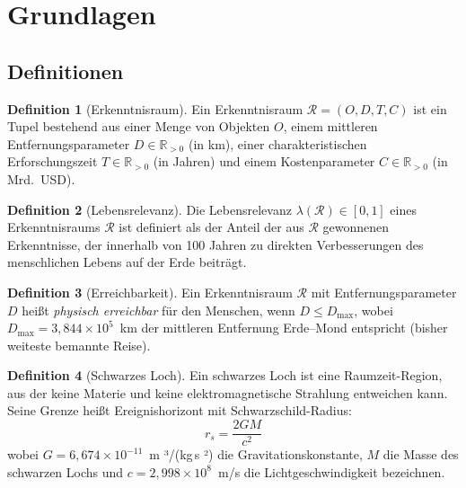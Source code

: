 ﻿\documentclass[a4paper,12pt]{article}
\theoremstyle{definition}
\newtheorem{definition}{Definition}
\begin{document}
\section{Grundlagen}

\subsection{Definitionen}

\begin{definition}[Erkenntnisraum]
    Ein Erkenntnisraum $\mathcal{R} = (O, D, T, C)$ ist ein Tupel bestehend
    aus einer Menge von Objekten $O$, einem mittleren Entfernungsparameter
    $D \in \mathbb{R}_{>0}$ (in km), einer charakteristischen Erforschungszeit
    $T \in \mathbb{R}_{>0}$ (in Jahren) und einem Kostenparameter
    $C \in \mathbb{R}_{>0}$ (in Mrd.~USD).
\end{definition}

\begin{definition}[Lebensrelevanz]
    Die Lebensrelevanz $\lambda(\mathcal{R}) \in [0,1]$ eines Erkenntnisraums
    $\mathcal{R}$ ist definiert als der Anteil der aus $\mathcal{R}$ gewonnenen
    Erkenntnisse, der innerhalb von 100 Jahren zu direkten Verbesserungen des
    menschlichen Lebens auf der Erde beiträgt.
\end{definition}

\begin{definition}[Erreichbarkeit]
    Ein Erkenntnisraum $\mathcal{R}$ mit Entfernungsparameter $D$ heißt
    \emph{physisch erreichbar} für den Menschen, wenn $D \leq D_{\max}$,
    wobei $D_{\max} = 3{,}844 \times 10^5$~km der mittleren Entfernung
    Erde--Mond entspricht (bisher weiteste bemannte Reise).
\end{definition}

\begin{definition}[Schwarzes Loch]
    Ein schwarzes Loch ist eine Raumzeit-Region, aus der keine Materie und
    keine elektromagnetische Strahlung entweichen kann. Seine Grenze heißt
    Ereignishorizont mit Schwarzschild-Radius:
    \[
        r_s = \frac{2GM}{c^2}
    \]
    wobei $G = 6{,}674 \times 10^{-11}$~m ³/(kg\,s ²) die Gravitationskonstante,
    $M$ die Masse des schwarzen Lochs und $c = 2{,}998 \times 10^8$~m/s die
    Lichtgeschwindigkeit bezeichnen.
\end{definition}
\end{document}

